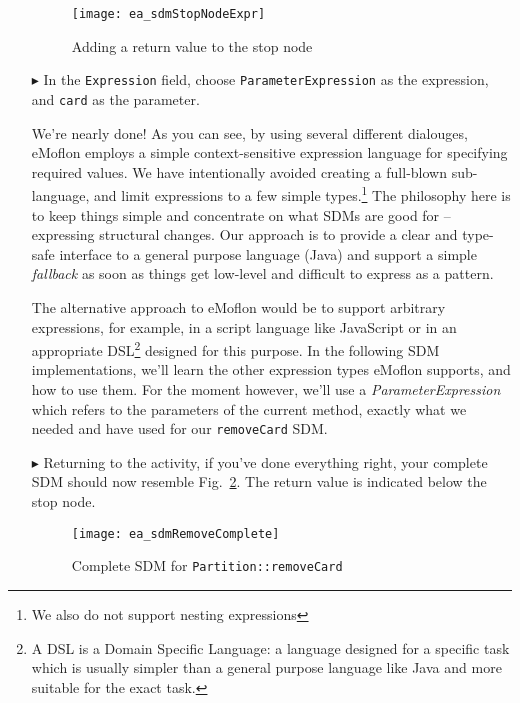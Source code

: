 \begin{itemize}
\begin{figure}[htbp]
\begin{center}
  \texttt{[image: ea\_sdmStopNodeExpr]}
  \caption{Adding a return value to the stop node}  
  \label{fig:stop_node_return_value}
\end{center}
\end{figure}

\item[$\blacktriangleright$] In the \texttt{Expression} field, choose \texttt{ParameterExpression} as the expression, and \texttt{card} as the parameter.

\vspace{0.5cm}

We're nearly done! As you can see, by using several different dialouges, eMoflon employs a simple context-sensitive expression language for specifying required
values. We have intentionally avoided creating a full-blown sub-language, and limit expressions to a few simple types.\footnote{We also do not support nesting
expressions} The philosophy here is to keep things simple and concentrate on what SDMs are good for -- expressing structural changes. Our approach is to
provide a clear and type-safe interface to a general purpose language (Java) and support a simple \emph{fallback} as soon as things get low-level and difficult
to express as a pattern.

The alternative approach to eMoflon would be to support arbitrary expressions, for example, in a script language like JavaScript or in an appropriate
DSL\footnote{A DSL is a Domain Specific Language: a language designed for a specific task which is usually simpler than a general purpose language like Java and
more suitable for the exact task.} designed for this purpose. In the following SDM implementations, we'll learn the other expression types eMoflon supports,
and how to use them. For the moment however, we'll use a \emph{ParameterExpression} which refers to the parameters of the current
method, exactly what we needed and have used for our \texttt{removeCard} SDM.

\item[$\blacktriangleright$] Returning to the activity, if you've done everything right, your complete SDM should now resemble
Fig.~\ref{fig:sdm_complete_control_flow}. The return value is indicated below the stop node.


\begin{figure}[htbp]
\begin{center}
  \texttt{[image: ea\_sdmRemoveComplete]}
  \caption{Complete SDM for \texttt{Partition::removeCard}}  
  \label{fig:sdm_complete_control_flow}
\end{center}
\end{figure}


\end{itemize}

